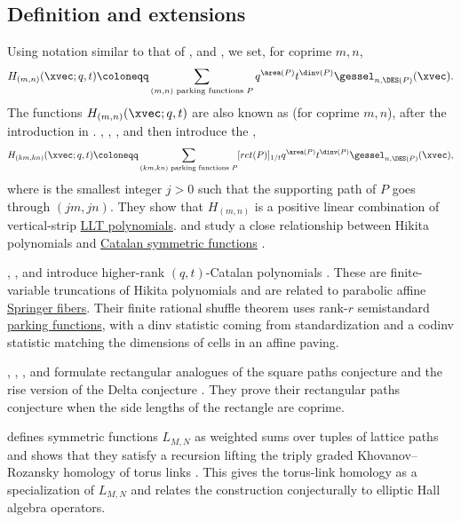 \subsection[hikitaPolynomialDefinition]{Definition and extensions}

Using notation similar to that of \cite[Eq.~(11.97)]{Haglund2015},
and \cite{QiuRemmel2018x}, we set, for coprime $m,n$,
\[
H_{(m,n)}(\xvec;q,t) \coloneqq
\sum_{(m,n) \text{ parking functions } P} q^{\area(P)} t^{\dinv(P)} \gessel_{n,\DES(P)}(\xvec).
\]
The functions $H_{(m,n)}(\xvec;q,t)$ are also known as
\label{hikitaPolynomial} (for coprime $m,n$),
after the introduction in \cite{Hikita2014}.
, , , and
 then introduce the
\label{extendedHikitaPolynomial},
\[
H_{(km,kn)}(\xvec;q,t) \coloneqq
\sum_{(km,kn) \text{ parking functions } P} [ret(P)]_{1/t}
q^{\area(P)} t^{\dinv(P)} \gessel_{n,\DES(P)}(\xvec),
\]
where \label{retStatistic} is the smallest integer $j \gt 0$ such
that the supporting path of $P$ goes through $(jm,jn)$.
They show \cite[Eq.~(6.3)]{BergeronGarsiaLevenXin2015} that
$H_{(m,n)}$ is a positive linear combination of vertical-strip
\hyperref[lltDefinitionTuples]{LLT polynomials}.
 and  study a close relationship
between Hikita polynomials and
\hyperref[catalanSymmetric]{Catalan symmetric functions}
\cite{KaliszewskiKarmakar2018}.

, ,
and  introduce higher-rank $(q,t)$-Catalan polynomials
\cite{GonzalezSimentalVazirani2023x}.  These are finite-variable truncations of
Hikita polynomials and are related to parabolic affine
\hyperref[springerFibers]{Springer fibers}.  Their
finite rational shuffle theorem uses rank-$r$ semistandard
\hyperref[parkingFunctions]{parking functions},
with a dinv statistic coming from standardization and a codinv statistic
matching the dimensions of cells in an affine paving.

, , , and
 formulate rectangular analogues of the square
paths conjecture and the rise version of the Delta conjecture
\cite{IraciPagariaPaoliniVandenWyngaerd2023}.  They prove their rectangular
paths conjecture when the side lengths of the rectangle are coprime.

 defines symmetric functions $L_{M,N}$ as weighted sums over
tuples of lattice paths and shows that they satisfy a recursion lifting the
triply graded Khovanov--Rozansky homology of torus links
\cite{Wilson2023TorusLink}.  This gives the torus-link homology as a
specialization of $L_{M,N}$ and relates the construction conjecturally to
elliptic Hall algebra operators.


